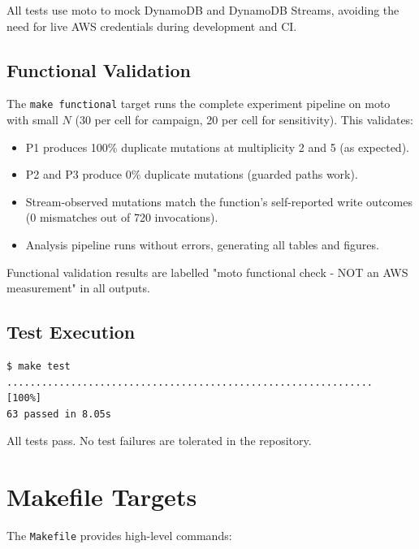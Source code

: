 All tests use moto to mock DynamoDB and DynamoDB Streams, avoiding the need for live AWS credentials during development and CI.

\subsection{Functional Validation}

The \texttt{make functional} target runs the complete experiment pipeline on moto with small $N$ (30 per cell for campaign, 20 per cell for sensitivity). This validates:

\begin{itemize}
    \item P1 produces 100\% duplicate mutations at multiplicity 2 and 5 (as expected).
    \item P2 and P3 produce 0\% duplicate mutations (guarded paths work).
    \item Stream-observed mutations match the function's self-reported write outcomes (0 mismatches out of 720 invocations).
    \item Analysis pipeline runs without errors, generating all tables and figures.
\end{itemize}

Functional validation results are labelled "moto functional check - NOT an AWS measurement" in all outputs.

\subsection{Test Execution}

\begin{verbatim}
$ make test
...............................................................          [100%]
63 passed in 8.05s
\end{verbatim}

All tests pass. No test failures are tolerated in the repository.

\section{Makefile Targets}

The \texttt{Makefile} provides high-level commands:

